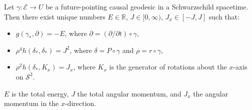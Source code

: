 Let $\gamma: \mathcal{E} \to U$ be a future-pointing causal geodesic in a Schwarzschild spacetime. Then there exist unique numbers $E \in \mathbb{R}$, $J \in [0, \infty)$, $J_x \in [-J, J]$ such that:
\begin{itemize}
\item[(a)] $g(\gamma_*, \partial) = -E$, where $\partial = (\partial/\partial t) \circ \gamma$,
\item[(b)] $\rho^4 h(\delta_*, \delta_*) = J^2$, where $\delta = P \circ \gamma$ and $\rho = r \circ \gamma$,
\item[(c)] $\rho^2 h(\delta_*, K_x) = J_x$, where $K_x$ is the generator of rotations about the $x$-axis on $\mathcal{S}^2$.
\end{itemize}
$E$ is the total energy, $J$ the total angular momentum, and $J_x$ the angular momentum in the $x$-direction.
